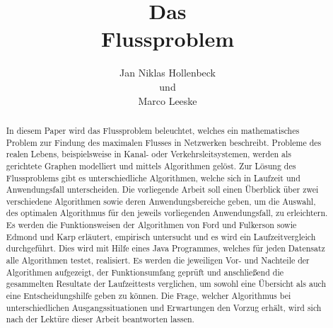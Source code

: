 \documentclass[runningheads,a4paper]{llncs}
\begin{document}
\mainmatter  %

\title{Das \\ Flussproblem}


%
%
\author{Jan Niklas Hollenbeck \\ und \\ Marco Leeske}
\maketitle


\begin{abstract}
In diesem Paper wird das Flussproblem beleuchtet, welches ein mathematisches Problem zur Findung des maximalen Flusses in Netz\-werken beschreibt.
 Probleme des realen Lebens, beispielsweise in Kanal- oder Verkehrsleitsystemen, werden als gerichtete Graphen mo\-delliert und mittels Algorithmen gelöst.
 Zur Lösung des Flussproblems gibt es unterschiedliche Algorithmen, welche sich in Laufzeit und Anwendungsfall unterscheiden.
 Die vorliegende Arbeit soll einen Überblick über zwei verschiedene Algorithmen sowie deren Anwendungsbereiche geben, um die Auswahl, des optimalen Algorithmus für den jeweils vorliegenden Anwendungsfall, zu erleichtern.
 Es werden die Funktionsweisen der Algorithmen von Ford und Fulkerson sowie Edmond und Karp erläutert, empirisch untersucht und es wird ein Laufzeitvergleich durchgeführt.
 Dies wird mit Hilfe eines Java Programmes, welches für jeden Datensatz alle Algorithmen testet, realisiert.
Es werden die jeweiligen Vor- und Nachteile der Algorithmen aufgezeigt, der Funktionsumfang geprüft und anschließend die gesammelten Resultate der Laufzeittests verglichen, um sowohl eine Übersicht als auch eine Entscheidungshilfe geben zu können.
 Die Frage, welcher Algorithmus bei unterschiedlichen Ausgangssituationen und Erwartungen den Vorzug erhält, wird sich nach der Lektüre dieser Arbeit beantworten lassen. 

\end{abstract}
\end{document}
